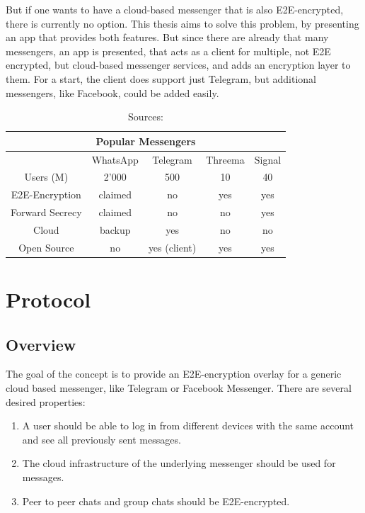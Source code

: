 \documentclass[a4paper, oneside]{discothesis}
\begin{document}
But if one wants to have a cloud-based messenger that is also  E2E-encrypted, there is currently no option. This thesis aims to solve this problem, by presenting an app that provides both features. But since there are already that many messengers, an app is presented, that acts as a client for multiple, not E2E encrypted, but cloud-based messenger services, and adds an encryption layer to them. For a start, the client does support just Telegram, but additional messengers, like Facebook, could be added easily.


\begin{table}[h!]
\centering
\begin{center}
 \begin{tabular}{|| c ||c c c c||} 
  \hline
 \multicolumn{5}{|c|}{Popular Messengers} \\
 \hline
 \hline
   & WhatsApp & Telegram & Threema & Signal \\ [0.5ex] 
 \hline\hline
 Users (M) & 2'000 & 500 & 10 & 40 \\ 
 \hline
 E2E-Encryption & claimed & no & yes & yes \\
 \hline
 Forward Secrecy & claimed & no & no & yes \\
 \hline
 Cloud & backup & yes & no & no \\
 \hline
 Open Source & no & yes (client) & yes & yes \\
 \hline
\end{tabular}
\end{center}
\caption{Sources: \cite{Business, Statistia}}
\label{table:messengers}
\end{table}


\chapter{Protocol}

\section{Overview}
The goal of the concept is to provide an E2E-encryption overlay for a generic cloud based messenger, like Telegram or Facebook Messenger. There are several desired properties:
\begin{enumerate}
  \item A user should be able to log in from different devices with the same account and see all previously sent messages. 
  \item The cloud infrastructure of the underlying messenger should be used for messages.
  \item Peer to peer chats and group chats should be E2E-encrypted.
\end{enumerate}
\end{document}
